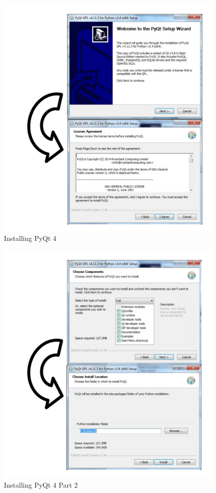 \begin{figure}[H]
    \includegraphics[width=\textwidth]{./Manual/Images/InstallingPyQt.pdf}
    \caption{Installing PyQt 4} \label{fig:InstallingPyQt}
\end{figure}

\begin{figure}[H]
    \includegraphics[width=\textwidth]{./Manual/Images/InstallingPyQtp2.pdf}
    \caption{Installing PyQt 4 Part 2} \label{fig:InstallingPyQtP2}
\end{figure}

